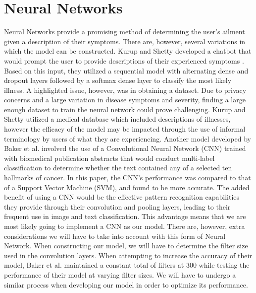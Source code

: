 \documentclass[12pt, final, onecolumn, comsoc, conference]{IEEEtran}
\begin{document}
\section{Neural Networks}
Neural Networks provide a promising method of
determining the user’s ailment given a description of their symptoms. There are,
however, several variations in which the model can be constructed. Kurup and
Shetty developed a chatbot that would prompt the user to provide descriptions of
their experienced symptoms \cite{10.1007/978-981-16-2543-5_22}. Based on this input, they utilized a sequential
model with alternating dense and dropout layers followed by a softmax dense
layer to classify the most likely illness. A highlighted issue, however, was in
obtaining a dataset. Due to privacy concerns and a large variation in disease
symptoms and severity, finding a large enough dataset to train the neural
network could prove challenging. Kurup and Shetty \cite{10.1007/978-981-16-2543-5_22} utilized a medical
database which included descriptions of illnesses, however the efficacy of the
model may be impacted through the use of informal terminology by users of what
they are experiencing. Another model developed by Baker et al. \cite{baker-etal-2016-cancer} involved the
use of a Convolutional Neural Network (CNN) trained with biomedical publication
abstracts that would conduct multi-label classification to determine whether the
text contained any of a selected ten hallmarks of cancer. In this paper, the
CNN’s performance was compared to that of a Support Vector Machine (SVM), and
found to be more accurate. The added benefit of using a CNN would be the
effective pattern recognition capabilities they provide through their
convolution and pooling layers, leading to their frequent use in image and text
classification. This advantage means that we are most likely going to implement
a CNN as our model. There are, however, extra considerations we will have to
take into account with this form of Neural Network. When constructing our model,
we will have to determine the filter size used in the convolution layers. When
attempting to increase the accuracy of their model, Baker et al. maintained a
constant total of filters at 300 while testing the performance of their model at
varying filter sizes. We will have to undergo a similar process when developing
our model in order to optimize its performance.
\end{document}
